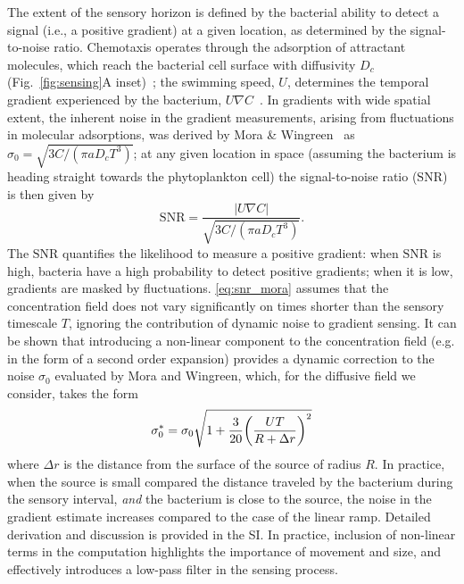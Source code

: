 \documentclass[9pt,twocolumn,twoside]{pnas-new}
\newcommand{\SNR}{\mathrm{SNR}}
\begin{document}
The extent of the sensory horizon is defined by the bacterial ability to detect a signal (i.e., a positive gradient) at a given location, as determined by the signal-to-noise ratio.
Chemotaxis operates through the adsorption of attractant molecules, which reach the bacterial cell surface with diffusivity $D_c$ (Fig.~\ref{fig:sensing}A inset)~\cite{berg1977physics}; the swimming speed, $U$, determines the temporal gradient experienced by the bacterium, $U\nabla C$~\cite{berg1977physics,hein2016physical}.
In gradients with wide spatial extent, the inherent noise in the gradient measurements, arising from fluctuations in molecular adsorptions, was derived by Mora \& Wingreen~\cite{mora2010limits} as $\sigma_0 = \sqrt{3C/(\pi a D_c T^3)}$; at any given location in space (assuming the bacterium is heading straight towards the phytoplankton cell) the signal-to-noise ratio ($\SNR$) is then given by
\begin{equation}\label{eq:snr_mora}
    \SNR = \dfrac{|U\nabla C|}{\sqrt{3C/(\pi a D_c T^3)}}.
\end{equation}
The $\SNR$ quantifies the likelihood to measure a positive gradient: 
when $\SNR$ is high, bacteria have a high probability to detect positive gradients; when it is low, gradients are masked by fluctuations.
\eqref{eq:snr_mora} assumes that the concentration field does not vary significantly on times shorter than the sensory timescale $T$, ignoring the contribution of dynamic noise to gradient sensing. It can be shown that introducing a non-linear component to the concentration field (e.g. in the form of a second order expansion) provides a dynamic correction to the noise $\sigma_0$ evaluated by Mora and Wingreen, which, for the diffusive field we consider, takes the form
\begin{equation}\label{eq:noise_2ndorder}
  \sigma_0^* = \sigma_0\sqrt{1 + \dfrac{3}{20}\qty(\dfrac{UT}{R+\Delta r})^2}
\end{equation}
where $\Delta r$ is the distance from the surface of the source of radius $R$. In practice, when the source is small compared the distance traveled by the bacterium during the sensory interval, \emph{and} the bacterium is close to the source, the noise in the gradient estimate increases compared to the case of the linear ramp. Detailed derivation and discussion is provided in the SI. In practice, inclusion of non-linear terms in the computation highlights the importance of movement and size, and effectively introduces a low-pass filter in the sensing process.
\end{document}
